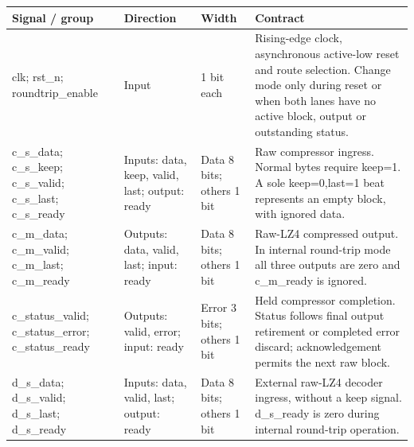 \documentclass[11pt,a4paper]{article}
\begin{document}
{\small\renewcommand{\arraystretch}{1.18}\begin{longtable}{@{}L{0.21\textwidth}|L{0.12\textwidth}|L{0.12\textwidth}|L{0.45\textwidth}@{}}\toprule

\textbf{Signal /\allowbreak{} group} & \textbf{Direction} & \textbf{Width} & \textbf{Contract}\\\midrule\endhead

clk; rst\_\allowbreak{}n; roundtrip\_\allowbreak{}enable & Input & 1 bit each & Rising-edge clock,\allowbreak{} asynchronous active-low reset and route selection. Change mode only during reset or when both lanes have no active block,\allowbreak{} output or outstanding status.\\[2pt]\hline

c\_\allowbreak{}s\_\allowbreak{}data; c\_\allowbreak{}s\_\allowbreak{}keep; c\_\allowbreak{}s\_\allowbreak{}valid; c\_\allowbreak{}s\_\allowbreak{}last; c\_\allowbreak{}s\_\allowbreak{}ready & Inputs: data,\allowbreak{} keep,\allowbreak{} valid,\allowbreak{} last; output: ready & Data 8 bits; others 1 bit & Raw compressor ingress. Normal bytes require keep=\allowbreak{}1. A sole keep=\allowbreak{}0,\allowbreak{}last=\allowbreak{}1 beat represents an empty block,\allowbreak{} with ignored data.\\[2pt]\hline

c\_\allowbreak{}m\_\allowbreak{}data; c\_\allowbreak{}m\_\allowbreak{}valid; c\_\allowbreak{}m\_\allowbreak{}last; c\_\allowbreak{}m\_\allowbreak{}ready & Outputs: data,\allowbreak{} valid,\allowbreak{} last; input: ready & Data 8 bits; others 1 bit & Raw-LZ4 compressed output. In internal round-trip mode all three outputs are zero and c\_\allowbreak{}m\_\allowbreak{}ready is ignored.\\[2pt]\hline

c\_\allowbreak{}status\_\allowbreak{}valid; c\_\allowbreak{}status\_\allowbreak{}error; c\_\allowbreak{}status\_\allowbreak{}ready & Outputs: valid,\allowbreak{} error; input: ready & Error 3 bits; others 1 bit & Held compressor completion. Status follows final output retirement or completed error discard; acknowledgement permits the next raw block.\\[2pt]\hline

d\_\allowbreak{}s\_\allowbreak{}data; d\_\allowbreak{}s\_\allowbreak{}valid; d\_\allowbreak{}s\_\allowbreak{}last; d\_\allowbreak{}s\_\allowbreak{}ready & Inputs: data,\allowbreak{} valid,\allowbreak{} last; output: ready & Data 8 bits; others 1 bit & External raw-LZ4 decoder ingress,\allowbreak{} without a keep signal. d\_\allowbreak{}s\_\allowbreak{}ready is zero during internal round-trip operation.\\[2pt]\hline


\end{longtable}}
\end{document}
